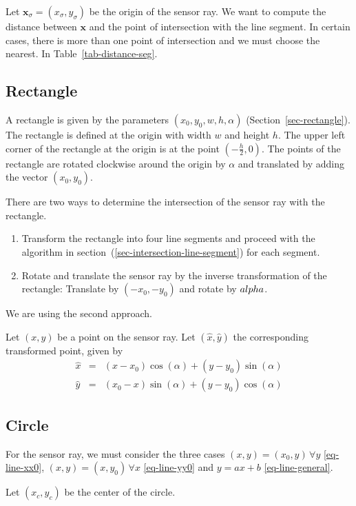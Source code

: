\documentclass[11pt]{article}
\newcommand{\xhat}{{\hat{x}}}
\newcommand{\yhat}{{\hat{y}}}
\newcommand{\bfx}{\mathbf{x}}
\begin{document}
Let ${\bfx}_\sigma=(x_\sigma, y_\sigma)$ be the origin of the sensor ray. We
want to compute the distance between $\bfx$ and the point of intersection with
the line segment. In certain cases, there is more than one point of
intersection and we must choose the nearest. In Table~\eqref{tab-distance-seg}.

\subsection{Rectangle}
\label{sec-intersection-rectangle}

A rectangle is given by the parameters $(x_0, y_0, w, h, \alpha)$
(Section~\ref{sec-rectangle}). The rectangle is defined at the origin with
width $w$ and height $h$. The upper left corner of the rectangle at the
origin is at the point $\left(-\frac{h}{2},0\right)$.
The points of the rectangle are rotated clockwise around the origin by
$\alpha$ and translated by adding the vector
$(x_0, y_0)$.

There are two ways to determine the intersection of the sensor ray with the
rectangle.
\begin{enumerate}
    \item Transform the rectangle into four line segments and
        proceed with the algorithm in
        section~(\ref{sec-intersection-line-segment}) for each segment.
    \item Rotate and translate the sensor ray by the inverse transformation of
        the rectangle: Translate by $(-x_0, -y_0)$ and rotate by $\-alpha$.
\end{enumerate}
We are using the second approach.

Let $(x, y)$ be a point on the sensor ray. Let $(\xhat, \yhat)$ the
corresponding transformed point, given by
\begin{eqnarray}
    \xhat &=& (x - x_0) \cos(\alpha) + (y - y_0) \sin(\alpha) \\
    \yhat &=& (x_0 - x) \sin(\alpha) + (y - y_0) \cos(\alpha)
\end{eqnarray}

\subsection{Circle}
\label{sec-intersection-circle}
For the sensor ray, we must consider the three cases $(x,y)=(x_0,y)\,\forall y$
\eqref{eq-line-xx0}, $(x,y)=(x,y_0)\,\forall x$ \eqref{eq-line-yy0} and $y=ax+b$
\eqref{eq-line-general}.

Let $(x_c, y_c)$ be the center of the circle.
\end{document}
